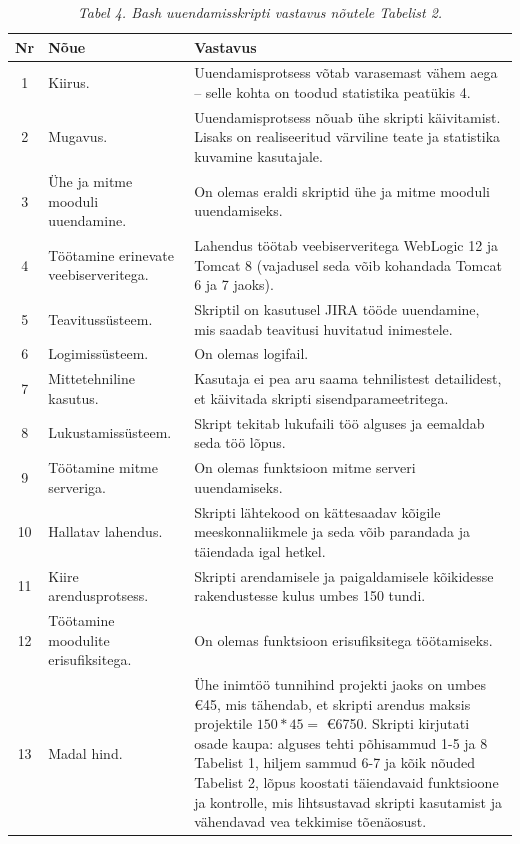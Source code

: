 \documentclass[12pt]{article}
\begin{document}
   \begin{table}[H]
    \caption*{\textit{Tabel 4. Bash uuendamisskripti vastavus nõutele Tabelist 2.}}
    
    \begin{tabular}{|c|p{3.5cm}|p{9.5cm}|}
      \hline
      \textbf{Nr} & \textbf{Nõue} & \textbf{Vastavus}\\
      \hline
      1 & Kiirus. & Uuendamisprotsess võtab varasemast vähem aega \--- selle kohta on toodud statistika peatükis 4.\\
      \hline
      2 & Mugavus. & Uuendamisprotsess nõuab ühe skripti käivitamist. Lisaks on realiseeritud värviline teate ja statistika kuvamine kasutajale.\\
      \hline
      3 & Ühe ja mitme mooduli uuendamine. & On olemas eraldi skriptid ühe ja mitme mooduli uuendamiseks.\\
      \hline
      4 & Töötamine erinevate veebiserveritega. & Lahendus töötab veebiserveritega WebLogic 12 ja Tomcat 8 (vajadusel seda võib kohandada Tomcat 6 ja 7 jaoks).\\
      \hline
      5 & Teavitussüsteem. & Skriptil on kasutusel JIRA tööde uuendamine, mis saadab teavitusi huvitatud inimestele.\\
      \hline
      6 & Logimissüsteem. & On olemas logifail.\\
      \hline
      7 & Mittetehniline kasutus. & Kasutaja ei pea aru saama tehnilistest detailidest, et käivitada skripti sisendparameetritega.\\
      \hline
      8 & Lukustamissüsteem. & Skript tekitab lukufaili töö alguses ja eemaldab seda töö lõpus.\\
      \hline
      9 & Töötamine mitme serveriga. & On olemas funktsioon mitme serveri uuendamiseks.\\
      \hline
      10 & Hallatav lahendus. & Skripti lähtekood on kättesaadav kõigile meeskonnaliikmele ja seda võib  parandada ja täiendada igal hetkel.\\
      \hline
      11 & Kiire arendusprotsess. & Skripti arendamisele ja paigaldamisele kõikidesse rakendustesse kulus umbes 150 tundi.\\
      \hline
      12 & Töötamine moodulite erisufiksitega. & On olemas funktsioon erisufiksitega töötamiseks.\\
      \hline
      13 & Madal hind. & Ühe inimtöö tunnihind projekti jaoks on umbes \euro 45, mis tähendab, et skripti arendus maksis projektile $150 * 45 = $ \euro 6750. Skripti kirjutati osade kaupa: alguses tehti põhisammud 1-5 ja 8 Tabelist 1, hiljem sammud 6-7 ja kõik nõuded Tabelist 2, lõpus koostati täiendavaid funktsioone ja kontrolle, mis lihtsustavad skripti kasutamist ja vähendavad vea tekkimise tõenäosust.\\
      \hline
    \end{tabular}
  \end{table}
  
\end{document}
